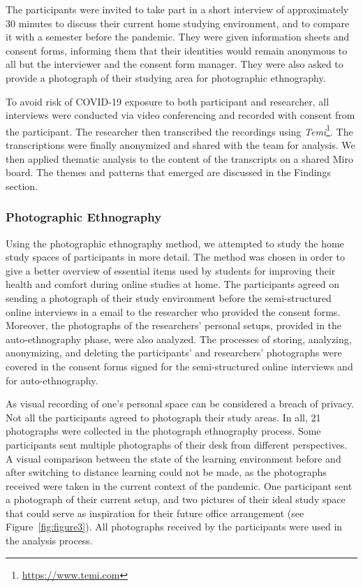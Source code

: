 \documentclass{sigchi}
\begin{document}
The participants were invited to take part in a short interview of approximately 30 minutes to discuss their current home studying environment, and to compare it with a semester before the pandemic. They were given information sheets and consent forms, informing them that their identities would remain anonymous to all but the interviewer and the consent form manager. They were also asked to provide a photograph of their studying area for photographic ethnography.

To avoid risk of COVID-19 exposure to both participant and researcher, all interviews were conducted via video conferencing and recorded with consent from the participant. The researcher then transcribed the recordings using \emph{Temi}\footnote{\url{https://www.temi.com}}. The transcriptions were finally anonymized and shared with the team for analysis. We then applied thematic analysis to the content of the transcripts on a shared Miro board. The themes and patterns that emerged are discussed in the Findings section.

\subsubsection{Photographic Ethnography}
Using the photographic ethnography method, we attempted to study the home study spaces of participants in more detail. The method was chosen in order to give a better overview of essential items used by students for improving their health and comfort during online studies at home. The participants agreed on sending a photograph of their study environment before the semi-structured online interviews in a email to the researcher who provided the consent forms. Moreover, the photographs of the researchers' personal setups, provided in the auto-ethnography phase, were also analyzed. The processes of storing, analyzing, anonymizing, and deleting the participants' and researchers' photographs were covered in the consent forms signed for the semi-structured online interviews and for auto-ethnography.

As visual recording of one's personal space can be considered a breach of privacy. Not all the participants agreed to photograph their study areas. In all, 21 photographs were collected in the photograph ethnography process. Some participants sent multiple photographs of their desk from different perspectives. A visual comparison between the state of the learning environment before and after switching to distance learning could not be made, as the photographs received were taken in the current context of the pandemic. One participant sent a photograph of their current setup, and two pictures of their ideal study space that could serve as inspiration for their future office arrangement (see Figure~\ref{fig:figure3}\cite{instagram_2019}). All photographs received by the participants were used in the analysis process.
\end{document}
